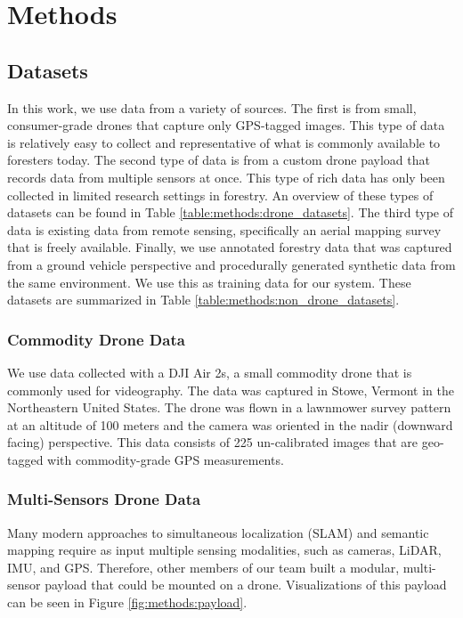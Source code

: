 \chapter{Methods} \label{chapMethod}
\section{Datasets}
In this work, we use data from a variety of sources. The first is from small, consumer-grade drones that capture only GPS-tagged images. This type of data is relatively easy to collect and representative of what is commonly available to foresters today. The second type of data is from a custom drone payload that records data from multiple sensors at once. This type of rich data has only been collected in limited research settings in forestry. An overview of these types of datasets can be found in Table \ref{table:methods:drone_datasets}. The third type of data is existing data from remote sensing, specifically an aerial mapping survey that is freely available. Finally, we use annotated forestry data that was captured from a ground vehicle perspective and procedurally generated synthetic data from the same environment. We use this as training data for our system. These datasets are summarized in Table \ref{table:methods:non_drone_datasets}.

\subsection{Commodity Drone Data}
We use data collected with a DJI Air 2s, a small commodity drone that is commonly used for videography. The data was captured in Stowe, Vermont in the Northeastern United States. The drone was flown in a lawnmower survey pattern at an altitude of 100 meters and the camera was oriented in the nadir (downward facing) perspective. This data consists of 225 un-calibrated images that are geo-tagged with commodity-grade GPS measurements.

\subsection{Multi-Sensors Drone Data}
Many modern approaches to simultaneous localization (SLAM) and semantic mapping require as input multiple sensing modalities, such as cameras, LiDAR, IMU, and GPS. Therefore, other members of our team built a modular, multi-sensor payload that could be mounted on a drone. Visualizations of this payload can be seen in Figure \ref{fig:methods:payload}. 

